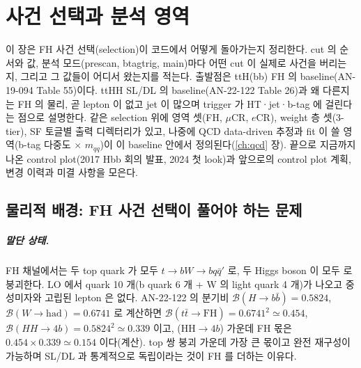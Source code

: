 \chapter{사건 선택과 분석 영역}\label{ch:selection}

이 장은 FH 사건 선택(selection)이 코드에서 어떻게 돌아가는지 정리한다. cut 의 순서와 값, 분석 모드(prescan, btagtrig, main)마다
어떤 cut 이 실제로 사건을 버리는지, 그리고 그 값들이 어디서 왔는지를 적는다. 출발점은 ttH(bb) FH 의 baseline(AN-19-094 Table 55)이다.
ttHH SL/DL 의 baseline(AN-22-122 Table 26)과 왜 다른지는 FH 의 물리, 곧 lepton 이 없고 jet 이 많으며 trigger 가 HT·jet·b-tag 에
걸린다는 점으로 설명한다. 같은 selection 위에 영역 셋(FH, $\mu$CR, $e$CR), weight 층 셋(3-tier), SF 토글별 출력 디렉터리가 있고,
나중에 QCD data-driven 추정과 fit 이 쓸 영역(b-tag 다중도 $\times$ $m_{qq}$)이 이 baseline 안에서 정의된다(\ref{ch:qcd} 장).
끝으로 지금까지 나온 control plot(2017 Hbb 회의 발표, 2024 첫 look)과 앞으로의 control plot 계획, 변경 이력과 미결 사항을 모은다.

\section{물리적 배경: FH 사건 선택이 풀어야 하는 문제}\label{sec:selection-physics}

\paragraph{말단 상태.}
FH 채널에서는 두 top quark 가 모두 $t\to bW\to bq\bar q'$ 로, 두 Higgs boson 이 모두 \Hbb{} 로 붕괴한다.
LO 에서 quark 10 개(b quark 6 개 + W 의 light quark 4 개)가 나오고 중성미자와 고립된 lepton 은 없다.
AN-22-122 의 분기비 $\mathcal{B}(H\to b\bar b)=0.5824$, $\mathcal{B}(W\to\text{had})=0.6741$ 로 계산하면
$\mathcal{B}(t\bar t\to\text{FH})=0.6741^2\simeq0.454$, $\mathcal{B}(HH\to4b)=0.5824^2\simeq0.339$ 이고, \ttHH{}(HH$\to4b$) 가운데 FH 몫은
$0.454\times0.339\simeq0.154$ 이다(계산). top 쌍 붕괴 가운데 가장 큰 몫이고 완전 재구성이 가능하며 SL/DL 과 통계적으로 독립이라는 것이
FH 를 더하는 이유다.

